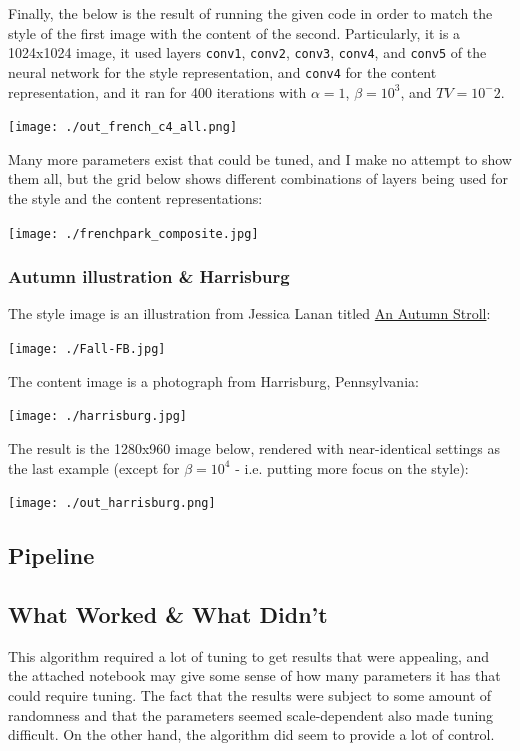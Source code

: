 \documentclass{article}
\begin{document}
Finally, the below is the result of running the given code in order to match the
style of the first image with the content of the second.
Particularly, it is a 1024x1024 image, it used layers \texttt{conv1},
\texttt{conv2}, \texttt{conv3}, \texttt{conv4}, and \texttt{conv5} of
the neural network for the style representation, and \texttt{conv4}
for the content representation, and it ran for 400 iterations with
$\alpha=1$, $\beta=10^3$, and $TV=10^-2$.

\texttt{[image: ./out\_french\_c4\_all.png]}

Many more parameters exist that could be tuned, and I make no attempt
to show them all, but the grid below shows different combinations of
layers being used for the style and the content representations:

\texttt{[image: ./frenchpark\_composite.jpg]}

\subsubsection{Autumn illustration \& Harrisburg}

The style image is an illustration from Jessica Lanan titled
\href{http://jessicalanan.com/an-autumn-stroll/}{An Autumn Stroll}:

\texttt{[image: ./Fall-FB.jpg]}

The content image is a photograph from Harrisburg, Pennsylvania:

\texttt{[image: ./harrisburg.jpg]}

The result is the 1280x960 image below, rendered with near-identical
settings as the last example (except for $\beta=10^4$ - i.e. putting
more focus on the style):

\texttt{[image: ./out\_harrisburg.png]}

\subsection{Pipeline}

\subsection{What Worked \& What Didn't}

This algorithm required a lot of tuning to get results that were
appealing, and the attached notebook may give some sense of how many
parameters it has that could require tuning.  The fact that the
results were subject to some amount of randomness and that the
parameters seemed scale-dependent also made tuning difficult.  On the
other hand, the algorithm did seem to provide a lot of control.
\end{document}

